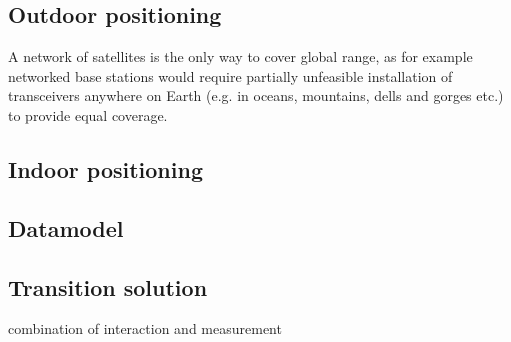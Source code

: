 \subsection*{Outdoor positioning}
	A network of satellites is the only way to cover global range, as for example networked base stations would require partially unfeasible installation of transceivers anywhere on Earth (e.g. in oceans, mountains, dells and gorges etc.) to provide equal coverage.
	
	
\subsection*{Indoor positioning}
	
\subsection*{Datamodel}
	
\subsection*{Transition solution}
 combination of interaction and measurement


